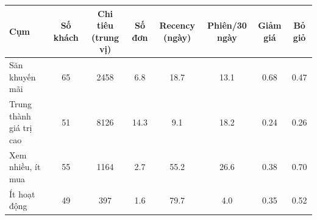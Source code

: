 \begin{tabular}{lccccccc}
\toprule
Cụm & Số khách & Chi tiêu (trung vị) & Số đơn & Recency (ngày) & Phiên/30 ngày & Giảm giá & Bỏ giỏ \\
\midrule
Săn khuyến mãi & 65 & 2458 & 6.8 & 18.7 & 13.1 & 0.68 & 0.47 \\
Trung thành giá trị cao & 51 & 8126 & 14.3 & 9.1 & 18.2 & 0.24 & 0.26 \\
Xem nhiều, ít mua & 55 & 1164 & 2.7 & 55.2 & 26.6 & 0.38 & 0.70 \\
Ít hoạt động & 49 & 397 & 1.6 & 79.7 & 4.0 & 0.35 & 0.52 \\
\bottomrule
\end{tabular}

